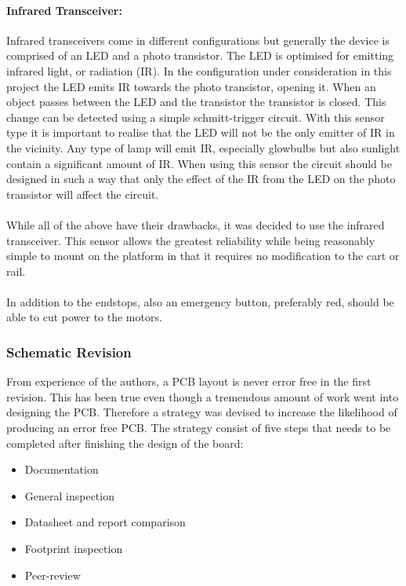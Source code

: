 \paragraph{Infrared Transceiver:} %
\label{par:infrared_transceiver}
Infrared transceivers come in different configurations but generally the device is comprised of an LED and a photo transistor.
The LED is optimised for emitting infrared light, or radiation (IR).
In the configuration under consideration in this project the LED emits IR towards the photo transistor, opening it.
When an object passes between the LED and the transistor the transistor is closed.
This change can be detected using a simple schmitt-trigger circuit. 
With this sensor type it is important to realise that the LED will not be the only emitter of IR in the vicinity.
Any type of lamp will emit IR, especially glowbulbs but also sunlight contain a significant amount of IR.
When using this sensor the circuit should be designed in such a way that only the effect of the IR from the LED on the photo transistor will affect the circuit.
\\~\\
While all of the above have their drawbacks, it was decided to use the infrared transceiver.
This sensor allows the greatest reliability while being reasonably simple to mount on the platform in that it requires no modification to the cart or rail.
\\~\\
In addition to the endstops, also an emergency button, preferably red, should be able to cut power to the motors.


\subsubsection{Schematic Revision} %
\label{ssub:schematic_revision}

From experience of the authors, a PCB layout is never error free in the first revision. 
This has been true even though a tremendous amount of work went into designing the PCB.
Therefore a strategy was devised to increase the likelihood of producing an error free PCB.
The strategy consist of five steps that needs to be completed after finishing the design of the board:

\begin{itemize}
	\item Documentation
	\item General inspection
	\item Datasheet and report comparison
	\item Footprint inspection 
	\item Peer-review
\end{itemize}

